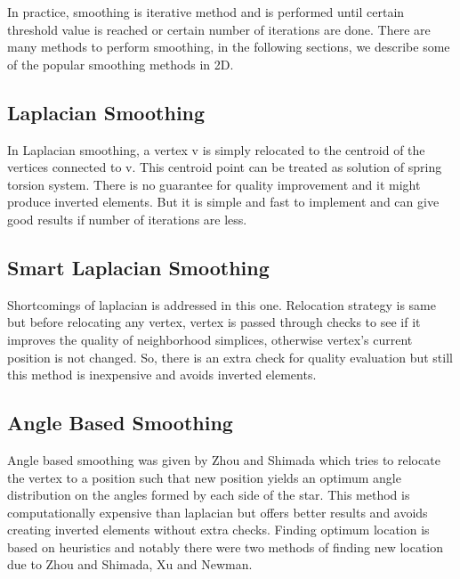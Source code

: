 In practice, smoothing is iterative method and is performed until certain threshold value is reached or certain number of iterations are done. There are many methods to perform smoothing, in the following sections, we describe some of the popular smoothing methods in 2D. 

\subsection{Laplacian Smoothing}
In Laplacian smoothing, a vertex v is simply relocated to the centroid of the vertices connected to v. This centroid point can be treated as solution of spring torsion system. There is no guarantee for quality improvement and it might produce inverted elements. But it is simple and fast to implement and can give good results if number of iterations are less.

\subsection{Smart Laplacian Smoothing}
Shortcomings of laplacian is addressed in this one. Relocation strategy is same but before relocating any vertex, vertex is passed through checks to see if it improves the quality of neighborhood simplices, otherwise vertex's current position is not changed. So, there is an extra check for quality evaluation but still this method is inexpensive and avoids inverted elements.

\subsection{Angle Based Smoothing}
Angle based smoothing was given by Zhou and Shimada which tries to relocate the vertex to a position such that new position yields an optimum angle distribution on the angles formed by each side of the star.
This method is computationally expensive than laplacian but offers better results and avoids creating inverted elements without extra checks. Finding optimum location is based on heuristics and notably there were two methods of finding new location due to Zhou and Shimada, Xu and Newman.

